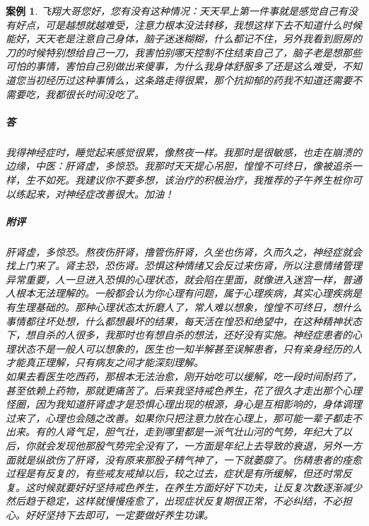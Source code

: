 \documentclass{ctexart}
\newtheorem{case}{案例}
\begin{document}
\begin{case}
    飞翔大哥您好，您有没有这种情况：天天早上第一件事就是感觉自己有没有好点，可是越想就越难受，注意力根本没法转移，我想这样下去不知道什么时候能好，天天老是注意自己身体，脑子迷迷糊糊，什么都记不住，另外我看到厨房的刀的时候特别想给自己一刀，我害怕别哪天控制不住结束自己了，脑子老是想那些可怕的事情，害怕自己别做出来傻事，为什么我身体舒服多了还是这么难受，不知道您当初经历过这种事情么，这条路走得很累，那个抗抑郁的药我不知道还需要不需要吃，我都很长时间没吃了。
    \subparagraph{答} 我得神经症时，睡觉起来感觉很累，像熬夜一样。我那时是很敏感，也走在崩溃的边缘，中医：肝肾虚，多惊恐。我那时天天提心吊胆，惶惶不可终日，像被追杀一样，生不如死。我建议你不要多想，该治疗的积极治疗，我推荐的子午养生桩你可以练起来，对神经症改善很大。加油！
    \subparagraph{附评} 肝肾虚，多惊恐。熬夜伤肝肾，撸管伤肝肾，久坐也伤肾，久而久之，神经症就会找上门来了。肾主恐，恐伤肾。恐惧这种情绪又会反过来伤肾，所以注意情绪管理异常重要，人一旦进入恐惧的心理状态，就会陷在里面，就像进入迷宫一样，普通人根本无法理解的。一般都会认为你心理有问题，属于心理疾病，其实心理疾病是有生理基础的。那种心理状态太折磨人了，常人难以想象，惶惶不可终日，想什么事情都往坏处想，什么都想最坏的结果，每天活在惶恐和绝望中，在这种精神状态下，想自杀的人很多，我那时也有想自杀的想法，还好没有实施。神经症患者的心理状态不是一般人可以想象的，医生也一知半解甚至误解患者，只有亲身经历的人才能真正理解，只有病友之间才能深刻理解。\\
    如果去看医生吃西药，那根本无法治愈，刚开始吃可以缓解，吃一段时间耐药了，甚至依赖上药物，那就更痛苦了。后来我坚持戒色养生，花了很久才走出那个心理怪圈，因为我知道肝肾虚才是恐惧心理出现的根源，身心是互相影响的，身体调理过来了，心理也会随之改善。如果你只把注意力放在心理上，那可能一辈子都走不出来。有的人肾气足，胆气壮，走到哪里都是一派气壮山河的气势，年纪大了以后，你就会发现他那股气势完全没有了，一方面是年纪上去导致的衰退，另外一方面就是纵欲伤了肝肾，没有原来那股子精气神了，一下就萎靡了。伤精患者的痊愈过程是有反复的，有些戒友戒掉以后，较之过去，症状是有所缓解，但还时常反复。这时候就要好好坚持戒色养生，在养生方面好好下功夫，让反复次数逐渐减少然后趋于稳定，这样就慢慢痊愈了，出现症状反复期很正常，不必纠结，不必担心。好好坚持下去即可，一定要做好养生功课。
\end{case}
\end{document}
